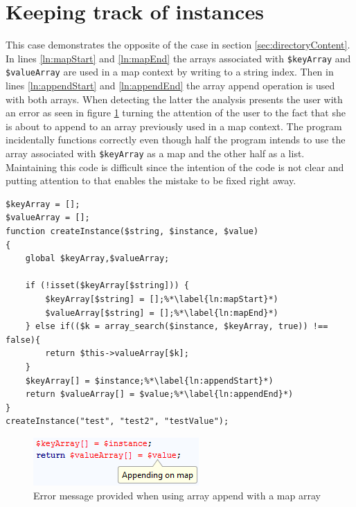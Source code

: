 \section{Keeping track of instances}
This case demonstrates the opposite of the case in section \ref{sec:directoryContent}. In lines \ref{ln:mapStart} and \ref{ln:mapEnd} the arrays associated with \texttt{\$keyArray} and \texttt{\$valueArray} are used in a map context by writing to a string index. Then in lines \ref{ln:appendStart} and \ref{ln:appendEnd} the array append operation is used with both arrays. When detecting the latter the analysis presents the user with an error as seen in figure \ref{fig:typeHandlerScreenshot} turning the attention of the user to the fact that she is about to append to an array previously used in a map context. The program incidentally functions correctly even though half the program intends to use the array associated with \texttt{\$keyArray} as a map and the other half as a list. Maintaining this code is difficult since the intention of the code is not clear and putting attention to that enables the mistake to be fixed right away.

\begin{program}
\begin{lstlisting}
$keyArray = [];
$valueArray = [];
function createInstance($string, $instance, $value)
{
    global $keyArray,$valueArray;

    if (!isset($keyArray[$string])) { 
        $keyArray[$string] = [];%*\label{ln:mapStart}*)
        $valueArray[$string] = [];%*\label{ln:mapEnd}*)
    } else if(($k = array_search($instance, $keyArray, true)) !== false){
        return $this->valueArray[$k];
    }
    $keyArray[] = $instance;%*\label{ln:appendStart}*)
    return $valueArray[] = $value;%*\label{ln:appendEnd}*)
}
createInstance("test", "test2", "testValue");
\end{lstlisting}
\caption{}
\label{lst:typeHandler}
\end{program}

\begin{figure}
\centering
\includegraphics[scale=0.6]{chapters/caseStudy/typeHandlerError}
\caption{Error message provided when using array append with a map array}
\label{fig:typeHandlerScreenshot}
\end{figure}